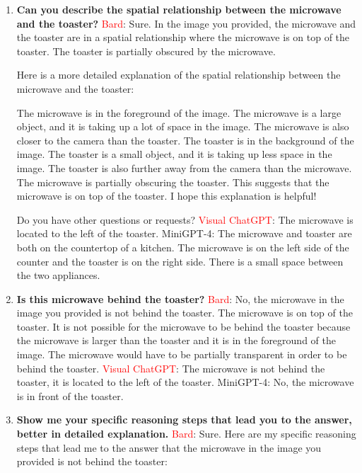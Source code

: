 \begin{enumerate}
    \item \textbf{Can you describe the spatial relationship between the microwave and the toaster?}
    \subitem \textcolor{Red}{Bard}: Sure. In the image you provided, the microwave and the toaster are in a spatial relationship where the microwave is on top of the toaster. The toaster is partially obscured by the microwave.

    Here is a more detailed explanation of the spatial relationship between the microwave and the toaster:
    
    The microwave is in the foreground of the image. The microwave is a large object, and it is taking up a lot of space in the image. The microwave is also closer to the camera than the toaster.
    The toaster is in the background of the image. The toaster is a small object, and it is taking up less space in the image. The toaster is also further away from the camera than the microwave.
    The microwave is partially obscuring the toaster. This suggests that the microwave is on top of the toaster.
    I hope this explanation is helpful!
    
    Do you have other questions or requests?
    \subitem \textcolor{red}{Visual ChatGPT}: The microwave is located to the left of the toaster.
    \subitem MiniGPT-4: The microwave and toaster are both on the countertop of a kitchen. The microwave is on the left side of the counter and the toaster is on the right side. There is a small space between the two appliances.
    \item \textbf{Is this microwave behind the toaster?}
    \subitem \textcolor{Red}{Bard}: 
    No, the microwave in the image you provided is not behind the toaster. The microwave is on top of the toaster. It is not possible for the microwave to be behind the toaster because the microwave is larger than the toaster and it is in the foreground of the image. The microwave would have to be partially transparent in order to be behind the toaster.
    \subitem \textcolor{red}{Visual ChatGPT}: The microwave is not behind the toaster, it is located to the left of the toaster.
    \subitem MiniGPT-4: No, the microwave is in front of the toaster.
    \item \textbf{Show me your specific reasoning steps that lead you to the answer, better in detailed explanation.}
    \subitem \textcolor{Red}{Bard}: 
    Sure. Here are my specific reasoning steps that lead me to the answer that the microwave in the image you provided is not behind the toaster:


\end{enumerate}
